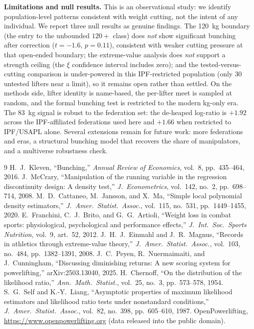 \documentclass[conference]{IEEEtran}
\begin{document}
\textbf{Limitations and null results.} This is an observational study: we identify
population-level patterns consistent with weight cutting, not the intent of any
individual. We report three null results as genuine findings. The 120~kg boundary
(the entry to the unbounded $120{+}$ class) does \emph{not} show significant
bunching after correction ($t=-1.6$, $p=0.11$), consistent with weaker cutting
pressure at that open-ended boundary; the extreme-value analysis does \emph{not} support a strength ceiling
(the $\xi$ confidence interval includes zero); and the tested-versus-cutting comparison is under-powered in this
IPF-restricted population (only 30 untested lifters near a limit), so it remains
open rather than settled. On the methods side,
lifter identity is name-based, the per-lifter meet is sampled at random, and the
formal bunching test is restricted to the modern kg-only era. The 83~kg signal is
robust to the federation set: the de-heaped log-ratio is $+1.92$ across the
IPF-affiliated federations used here and $+1.66$ when restricted to IPF/USAPL alone.
Several extensions remain for future work: more federations and eras, a
structural bunching model that recovers the share of manipulators, and a
multiverse robustness check.

\balance
\begin{thebibliography}{9}
 H.~J.~Kleven, ``Bunching,'' \emph{Annual Review of Economics},
vol.~8, pp.~435--464, 2016.
 J.~McCrary, ``Manipulation of the running variable in the
regression discontinuity design: A density test,'' \emph{J.\ Econometrics},
vol.~142, no.~2, pp.~698--714, 2008.
 M.~D.~Cattaneo, M.~Jansson, and X.~Ma, ``Simple local polynomial
density estimators,'' \emph{J.\ Amer.\ Statist.\ Assoc.}, vol.~115, no.~531,
pp.~1449--1455, 2020.
 E.~Franchini, C.~J.~Brito, and G.~G.~Artioli, ``Weight loss in
combat sports: physiological, psychological and performance effects,'' \emph{J.\ Int.\
Soc.\ Sports Nutrition}, vol.~9, art.~52, 2012.
 J.~H.~J.~Einmahl and J.~R.~Magnus, ``Records in athletics through
extreme-value theory,'' \emph{J.\ Amer.\ Statist.\ Assoc.}, vol.~103, no.~484,
pp.~1382--1391, 2008.
 J.~C.~Peyen, R.~Nuermaimaiti, and J.~Cunningham, ``Discussing
diminishing returns: A new scoring system for powerlifting,'' arXiv:2503.13040,
2025.
 H.~Chernoff, ``On the distribution of the likelihood ratio,''
\emph{Ann.\ Math.\ Statist.}, vol.~25, no.~3, pp.~573--578, 1954.
\bibitem{selfliang} S.~G.~Self and K.-Y.~Liang, ``Asymptotic properties of maximum
likelihood estimators and likelihood ratio tests under nonstandard conditions,''
\emph{J.\ Amer.\ Statist.\ Assoc.}, vol.~82, no.~398, pp.~605--610, 1987.
\bibitem{opl} OpenPowerlifting, \url{https://www.openpowerlifting.org} (data
released into the public domain).
\end{thebibliography}
\end{document}
